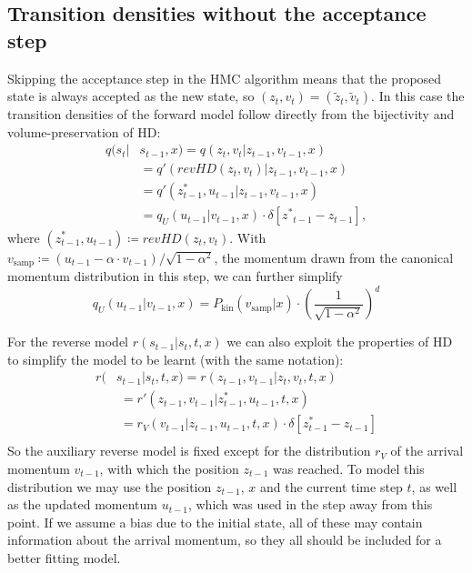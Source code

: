 \subsection{Transition densities without the acceptance step}
\label{sec:TransitionDensitiesNoAcceptance}
Skipping the acceptance step in the HMC algorithm means that the proposed state is always accepted as the new state, so $(z_t, v_t) = (\tilde{z}_t, \tilde{v}_t)$. In this case the transition densities of the forward model follow directly from the bijectivity and volume-preservation of HD:
\begin{equation} \label{eq:ForwardTransitionNoAcceptance}
\begin{split}
q(s_t|&s_{t-1}, x) = q(z_t, v_t| z_{t-1}, v_{t-1}, x) \\
&= q'(revHD(z_t, v_t)|z_{t-1}, v_{t-1}, x) \\
&= q'(z^*_{t-1}, u_{t-1} |z_{t-1}, v_{t-1}, x) \\
&= q_U(u_{t-1}|v_{t-1}, x) \cdot \delta[{z^*}_{t-1} - z_{t-1}],
\end{split}
\end{equation}
where $(z^*_{t-1}, u_{t-1}) \coloneqq revHD(z_t, v_t)$. With $v_{\textrm{samp}} \coloneqq (u_{t-1} - \alpha \cdot v_{t-1})/{\sqrt{1 - \alpha^2}}$, the momentum drawn from the canonical momentum distribution in this step, we can further simplify
\begin{equation} \label{eq:qUDefinition}
q_U(u_{t-1}|v_{t-1}, x) = P_\textrm{kin}(v_{\textrm{samp}}|x) \cdot (\frac{1}{\sqrt{1 - \alpha^2}})^{d}
\end{equation}

For the reverse model $r(s_{t-1}|s_t, t, x)$ we can also exploit the properties of HD to simplify the model to be learnt (with the same notation):
\begin{equation} \label{eq:ReverseTransitionNoAcceptance}
\begin{split}
r(&s_{t-1}|s_{t}, t, x) = r(z_{t-1}, v_{t-1}| z_t, v_t, t, x) \\
&\;= r'(z_{t-1}, v_{t-1} |z^*_{t-1}, u_{t-1},t , x) \\
&\;= r_V(v_{t-1}|z_{t-1}, u_{t-1}, t, x) \cdot \delta[z^*_{t-1} - z_{t-1}] \\
\end{split}
\end{equation}
So the auxiliary reverse model is fixed except for the distribution $r_V$ of the arrival momentum $v_{t-1}$, with which the position $z_{t-1}$ was reached. To model this distribution we may use the position $z_{t-1}$, $x$ and the current time step $t$, as well as the updated momentum $u_{t-1}$, which was used in the step away from this point. If we assume a bias due to the initial state, all of these may contain information about the arrival momentum, so they all should be included for a better fitting model.

